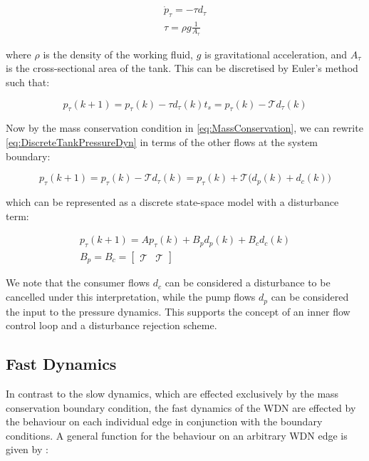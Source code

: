 \begin{gather}\label{eq:TankPressureDyn}
	\dot{p}_\tau = -\tau d_\tau
	\\ \tau = \rho g \frac{1}{A_\tau}
\end{gather}

where $\rho$ is the density of the working fluid, $g$ is gravitational acceleration, and $A_\tau$ is the cross-sectional area of the tank. This can be discretised by Euler's method such that:

\begin{equation}\label{eq:DiscreteTankPressureDyn}
	p_\tau(k+1) = p_\tau(k) - \tau d_\tau(k)t_s =  p_\tau(k) - \mathcal{T} d_\tau(k)
\end{equation}

Now by the mass conservation condition in \cref{eq:MassConservation}, we can rewrite \cref{eq:DiscreteTankPressureDyn} in terms of the other flows at the system boundary:

\begin{equation}\label{eq:DiscreteTankPressureDynConProd}
	p_\tau(k+1) = p_\tau(k) - \mathcal{T} d_\tau(k) = p_\tau(k) + \mathcal{T} \Big(d_p(k) + d_c(k)\Big)
\end{equation}

which can be represented as a discrete state-space model with a disturbance term:

\begin{equation}\label{eq:DiscreteTankPressureStateSpace}
	\begin{gathered}
	p_\tau(k+1) = Ap_\tau(k) + B_p d_p(k) + B_cd_c(k) \\ B_p = B_c = \begin{bmatrix}\mathcal{T} & \mathcal{T} \end{bmatrix}
	\end{gathered}
\end{equation}

We note that the consumer flows $d_c$ can be considered a disturbance to be cancelled under this interpretation, while the pump flows $d_p$ can be considered the input to the pressure dynamics. This supports the concept of an inner flow control loop and a disturbance rejection scheme.

\subsection{Fast Dynamics}\label{subsec:FastDynamics}

In contrast to the slow dynamics, which are effected exclusively by the mass conservation boundary condition, the fast dynamics of the WDN are effected by the behaviour on each individual edge in conjunction with the boundary conditions. A general function for the behaviour on an arbitrary WDN edge is given by \cite{Jensen}:

